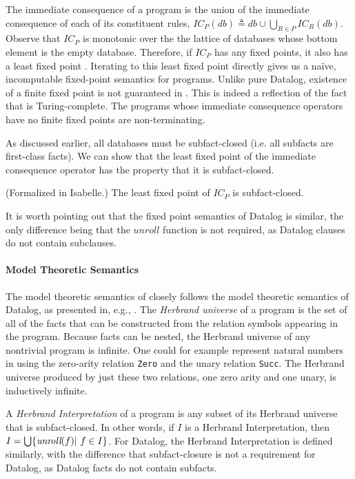 The immediate consequence of a program is the union of the immediate
consequence of each of its constituent rules, $
\textit{IC}_P(\textit{db}) \triangleq \textit{db} \cup \bigcup_{R \in
  P} \textit{IC}_R(\textit{db})$. Observe that $\textit{IC}_P$ is
monotonic over the the lattice of databases whose bottom element is
the empty database. Therefore, if $\textit{IC}_P$ has any fixed
points, it also has a least fixed point \cite{tarski1955lattice}.
Iterating to this least fixed point directly gives us a na\"ive, incomputable
fixed-point semantics for \core{} programs.
Unlike pure Datalog, existence of a finite fixed point is not guaranteed in
\core{}. This is indeed a reflection of the fact that \core{} is
Turing-complete. The \core{} programs whose immediate consequence
operators have no finite fixed points are non-terminating.

As discussed earlier, all \slog{} databases must be subfact-closed (i.e. all subfacts are first-class facts). We can show that the least fixed point of the immediate consequence operator has the property that it is subfact-closed.
\begin{lemma}
(Formalized in Isabelle.) The least fixed point of $\textit{IC}_P$ is subfact-closed. 
\end{lemma}

It is worth pointing out that the fixed point semantics of Datalog is similar, the only difference being that the $\textit{unroll}$ function is not required, as Datalog clauses do not contain subclauses.

\paragraph*{Model Theoretic Semantics}

The model theoretic semantics of \core{} closely follows the model
theoretic semantics of Datalog, as presented in, e.g.,
\cite{ceri1989you-datalog}. The \emph{Herbrand universe} of a \core{}
program is the set of all of the facts that can be constructed from
the relation symbols appearing in the program. Because \core{} facts
can be nested, the Herbrand universe of any nontrivial \core{} program
is infinite. One could for example represent natural numbers in
\core{} using the zero-arity relation \lstinline{Zero} and the unary
relation \lstinline{Succ}. The Herbrand universe produced by just
these two relations, one zero arity and one unary, is inductively infinite.

A \emph{Herbrand Interpretation} of a \core{} program is any subset of its Herbrand universe that is subfact-closed. In other words, if $I$ is a Herbrand Interpretation, then $I = \bigcup \{\textit{unroll}(f) \linebreak |\ f \in I\}$. For Datalog, the Herbrand Interpretation is defined similarly, with the difference that subfact-closure is not a requirement for Datalog, as Datalog facts do not contain subfacts.

